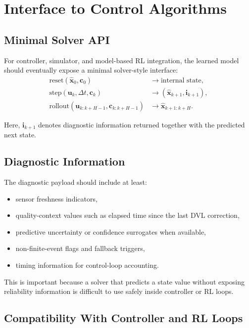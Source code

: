 \section{Interface to Control Algorithms}

\subsection{Minimal Solver API}

For controller, simulator, and model-based RL integration, the learned model should eventually expose a minimal solver-style interface:
\begin{align}
\mathrm{reset}(\hat{\mathbf{x}}_0, \mathbf{c}_0) &\rightarrow \text{internal state}, \\
\mathrm{step}(\mathbf{u}_k, \Delta t, \mathbf{c}_k) &\rightarrow (\hat{\mathbf{x}}_{k+1}, \mathbf{i}_{k+1}), \\
\mathrm{rollout}(\mathbf{u}_{k:k+H-1}, \mathbf{c}_{k:k+H-1}) &\rightarrow \hat{\mathbf{x}}_{k+1:k+H}.
\end{align}

Here, $\mathbf{i}_{k+1}$ denotes diagnostic information returned together with the predicted next state.

\subsection{Diagnostic Information}

The diagnostic payload should include at least:
\begin{itemize}
  \item sensor freshness indicators,
  \item quality-context values such as elapsed time since the last DVL correction,
  \item predictive uncertainty or confidence surrogates when available,
  \item non-finite-event flags and fallback triggers,
  \item timing information for control-loop accounting.
\end{itemize}

This is important because a solver that predicts a state value without exposing reliability information is difficult to use safely inside controller or RL loops.

\subsection{Compatibility With Controller and RL Loops}

